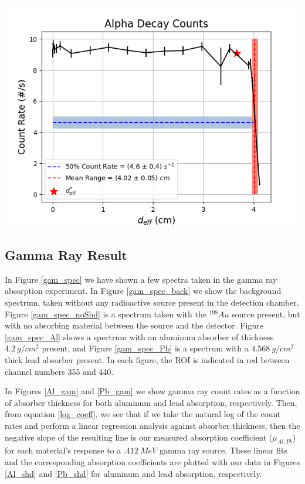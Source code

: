 \documentclass[10pt]{article}
\newenvironment{Figure}
{\par\medskip\noindent\minipage{\linewidth}}
{\endminipage\par\medskip}
\begin{document}
\begin{multicols}{2}
\begin{Figure}
	\includegraphics[width=\textwidth,keepaspectratio]{alf_peak_cnts.png}
\end{Figure} 

\subsection{Gamma Ray Result} \label{res_gamma}

In Figure \ref{gam_spec} we have shown a few spectra taken in the gamma ray absorption experiment.  In Figure \ref{gam_spec_back} we show the background spectrum, taken without any radioactive source present in the detection chamber.  Figure \ref{gam_spec_noShd} is a spectrum taken with the $^{198}Au$ source present, but with no absorbing material between the source and the detector.  Figure \ref{gam_spec_Al} shows a spectrum with an aluminum absorber of thickness $4.2 \ g/cm^{2}$ present, and Figure \ref{gam_spec_Pb} is a spectrum with a $4.568 \ g/cm^{2}$ thick lead absorber present.  In each figure, the ROI is indicated in red between channel numbers 355 and 440. \par
	
In Figures \ref{Al_gam} and \ref{Pb_gam} we show gamma ray count rates as a function of absorber thickness for both aluminum and lead absorption, respectively. Then, from equation \ref{log_coeff}, we see that if we take the natural log of the count rates and perform a linear regression analysis against absorber thickness, then the negative slope of the resulting line is our measured absorption coefficient ($\mu_{Al,Pb}$) for each material's response to a $.412 \ MeV$ gamma ray source.  These linear fits and the corresponding absorption coefficients are plotted with our data in Figures \ref{Al_shd} and \ref{Pb_shd} for aluminum and lead absorption, respectively.


\end{multicols}
\end{document}
